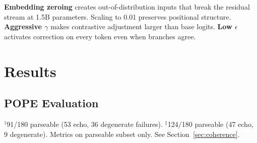 \documentclass[10pt,twocolumn]{article}
\begin{document}
\begin{table}[h]
\centering
\caption{Small-model calibration: original CVG parameters vs.\ our recalibrated values for $\leq$2B models.}
\label{tab:calib}
\small
{}
\end{table}

\textbf{Embedding zeroing} creates out-of-distribution inputs that break the residual stream at 1.5B parameters. Scaling to 0.01 preserves positional structure. \textbf{Aggressive $\gamma$} makes contrastive adjustment larger than base logits. \textbf{Low $\epsilon$} activates correction on every token even when branches agree.

\section{Results}
\label{sec:results}

\subsection{POPE Evaluation}

\begin{table}[h]
\centering
\caption{POPE random split results (TinyLLaVA-1.5B, COCO val2014, $N{=}180$). Parseable: responses yielding yes/no. 95\% Wilson confidence intervals in parentheses.}
\label{tab:pope}
\small
{}

\vspace{3pt}
{\scriptsize $^\dagger$91/180 parseable (53 echo, 36 degenerate failures). $^\ddagger$124/180 parseable (47 echo, 9 degenerate). Metrics on parseable subset only. See Section~\ref{sec:coherence}.}
\end{table}
\end{document}
